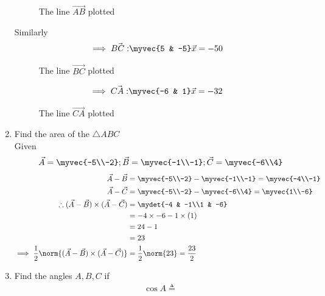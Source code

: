 \documentclass[11pt]{book}
\begin{document}
\begin{enumerate}[label=\thesection.\arabic*.,ref=\thesection.\theenumi]
\begin{figure}[H]
\caption{ The line $\vec{AB}$ plotted}
\label{fig:line AB}
\end{figure}
Similarly
\begin{align}
	\implies
	\vec{BC:} \myvec{5 & -5}\vec{x} &=-50
\end{align}
\begin{figure}[H]
\caption{ The line $\vec{BC}$ plotted}
\label{fig:line BC}
\end{figure}
\begin{align}
	\implies \vec{CA:} \myvec{-6 & 1}\vec{x} &= -32
\end{align}
\begin{figure}[H]
\caption{ The line $\vec{CA}$ plotted}
\label{fig:line CA}
\end{figure}
\item Find the area of the $\triangle ABC$
	\solution\\
Given
\begin{align}
 \vec{A} = \myvec{-5\\-2};
 \vec{B} = \myvec{-1\\-1};
 \vec{C} = \myvec{-6\\4}
 \end{align}
 \begin{align}
 \vec{A}-\vec{B} &= \myvec{-5\\-2} - \myvec{-1\\-1} = \myvec{-4\\-1}\\
 \vec{A}-\vec{C} &= \myvec{-5\\-2} - \myvec{-6\\4} = \myvec{1\\-6}\\
\therefore(\vec{A}-\vec{B})\times(\vec{A}-\vec{C}) 
 &= \mydet{-4 & -1\\1 & -6}\\
 &= -4 \times -6 - 1 \times (1)\\ &= 24 - 1\\ &=23 \\
 \implies\frac{1}{2}\norm{(\vec{A}-\vec{B})\times(\vec{A}-\vec{C})} &= \frac{1}{2}\norm{23}= \frac{23}{2}
\end{align}
\item Find the angles $A, B, C$ if 
    \label{prop:angle2d}
  \begin{align}
    \label{eq:angle2d}
   \cos A \triangleq 

\end{align}
\end{enumerate}
\end{document}
